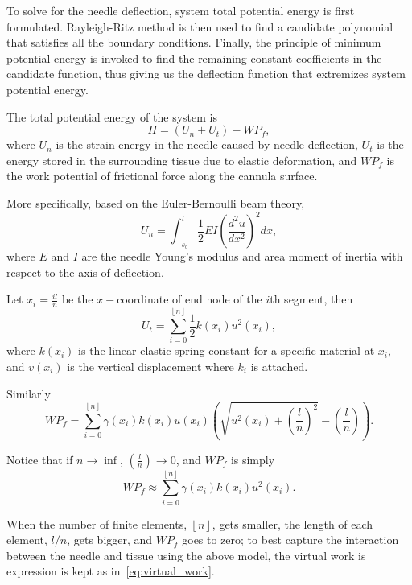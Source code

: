 To solve for the needle deflection, system total potential energy is first formulated. Rayleigh-Ritz method is then used to find a candidate polynomial that satisfies all the boundary conditions. Finally, the principle of minimum potential energy is invoked to find the remaining constant coefficients in the candidate function, thus giving us the deflection function that extremizes system potential energy. 

The total potential energy of the system is
\begin{equation}
  \Pi = (U_n + U_t) - WP_f,
\end{equation}
where $U_n$ is the strain energy in the needle caused by needle deflection, $U_t$ is the energy stored in the surrounding tissue due to elastic deformation, and $WP_f$ is the work potential of frictional force along the cannula surface.

More specifically, based on the Euler-Bernoulli beam theory,
\begin{equation}
  U_n = \int_{-s_b}^l{\frac{1}{2} EI \left(\frac{d^2u}{dx^2}\right)^2} dx,
\end{equation}
where $E$ and $I$ are the needle Young's modulus and area moment of inertia with respect to the axis of deflection.

Let $x_i = \frac{il}{n}$ be the $x-$coordinate of end node of the $i$th segment, then
\begin{equation}
  U_t = \sum_{i = 0}^{\left\lfloor n \right\rfloor} \frac{1}{2}k(x_i)u^2(x_i),
\end{equation}
where $k(x_i)$ is the linear elastic spring constant for a specific material at $x_i$, and $v(x_i)$ is the vertical displacement where $k_i$ is attached. 

Similarly
\begin{equation}
  WP_f = \sum_{i = 0}^{\left\lfloor n \right\rfloor} \gamma(x_i)k(x_i) u(x_i) \left( \sqrt{u^2(x_i) + \left(\frac{l}{n}\right)^2} - \left(\frac{l}{n}\right)\right).
\end{equation}

Notice that if $n \to \inf$, $\left(\frac{l}{n} \right) \to 0$, and $WP_f$ is simply
\begin{equation}
  WP_f \approx \sum_{i = 0}^{\left\lfloor n \right\rfloor} \gamma(x_i) k(x_i) u^2(x_i).
  \label{eq:virtual_work}
\end{equation}

When the number of finite elements, $\left\lfloor n\right\rfloor$, gets smaller, the length of each element, $l/n$, gets bigger, and $WP_f$ goes to zero; to best capture the interaction between the needle and tissue using the above model, the virtual work is expression is kept as in~\cref{eq:virtual_work}.


